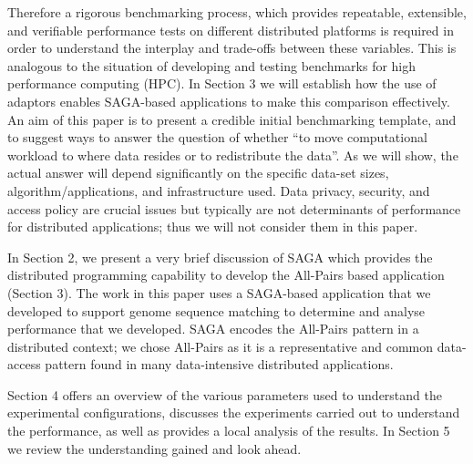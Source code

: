 \documentclass{rspublic}
\begin{document}
Therefore a rigorous benchmarking process, which provides repeatable,
extensible, and verifiable performance tests on different distributed
platforms is required in order to understand the interplay and
trade-offs between these variables. This is analogous to the situation
of developing and testing benchmarks for high performance computing
(HPC).  In Section 3 we will establish how the use of adaptors enables
SAGA-based applications to make this comparison effectively. An aim of
this paper is to present a credible initial benchmarking template, and
to suggest ways to answer the question of whether ``to move
computational workload to where data resides or to redistribute the
data''. As we will show, the actual answer will depend significantly
on the specific data-set sizes, algorithm/applications, and
infrastructure used. Data privacy, security, and access policy are
crucial issues but typically are not determinants of performance for
distributed applications; thus we will not consider them in this
paper.
 
In Section 2, we present a very brief discussion of SAGA which
provides the distributed programming capability to develop the
All-Pairs based application (Section 3). The work in this paper uses a
SAGA-based application that we developed to support genome sequence
matching to determine and analyse performance that we developed. SAGA
encodes the All-Pairs pattern in a distributed context; we chose
All-Pairs as it is a representative and common data-access pattern
found in many data-intensive distributed applications.

Section 4 offers an overview of the various parameters used to
understand the experimental configurations, discusses the experiments
carried out to understand the performance, as well as provides a local
analysis of the results. In Section 5 we review the understanding
gained and look ahead.


\end{document}
